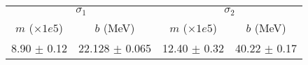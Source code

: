 \begin{tabular}{cc|cc}
\multicolumn{2}{c|}{$\sigma_1$} & \multicolumn{2}{|c}{$\sigma_2$} \\
$m$ ($\times1e5$) & $b$ (MeV) & $m$ ($\times1e5$) & $b$ (MeV) \\
\hline
8.90 $\pm$ 0.12 & 22.128 $\pm$ 0.065 & 12.40 $\pm$ 0.32 & 40.22 $\pm$ 0.17\\
\end{tabular}
